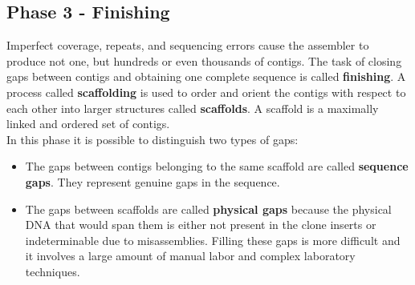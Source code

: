 \subsection{Phase 3 - Finishing}
Imperfect coverage, repeats, and sequencing errors cause the assembler to produce not one, but hundreds or even thousands of contigs. The task of closing gaps between contigs and obtaining one complete sequence is called \textbf{finishing}.
A process called \textbf{scaffolding} is used to order and orient the contigs with respect to each other into larger structures called \textbf{scaffolds}. A scaffold is a maximally linked and ordered set of contigs.\\
In this phase it is possible to distinguish two types of gaps:
\begin{itemize}
	\item The gaps between contigs belonging to the same scaffold are called \textbf{sequence gaps}. They represent genuine gaps in the sequence.
	\item The gaps between scaffolds are called \textbf{physical gaps} because the physical DNA that would span them is either not present in the clone inserts or indeterminable due to misassemblies. Filling these gaps is more difficult and it involves a large amount of manual labor and complex laboratory techniques. 
\end{itemize}

